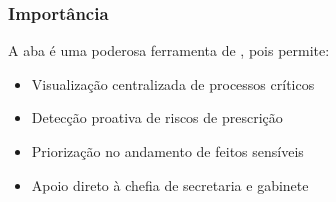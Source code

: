 \documentclass[letterpaper,10pt,brazil]{sphinxmanual}
\begin{document}
\subsubsection{Importância}
\label{\detokenize{projud_61_acompanhamentoprescricao:importancia}}
\sphinxAtStartPar
A aba  é uma poderosa ferramenta de , pois permite:
\begin{itemize}
\item {} 
\sphinxAtStartPar
Visualização centralizada de processos críticos

\item {} 
\sphinxAtStartPar
Detecção proativa de riscos de prescrição

\item {} 
\sphinxAtStartPar
Priorização no andamento de feitos sensíveis

\item {} 
\sphinxAtStartPar
Apoio direto à chefia de secretaria e gabinete

\end{itemize}



\renewcommand{\indexname}{Índice}
\printindex
\end{document}
